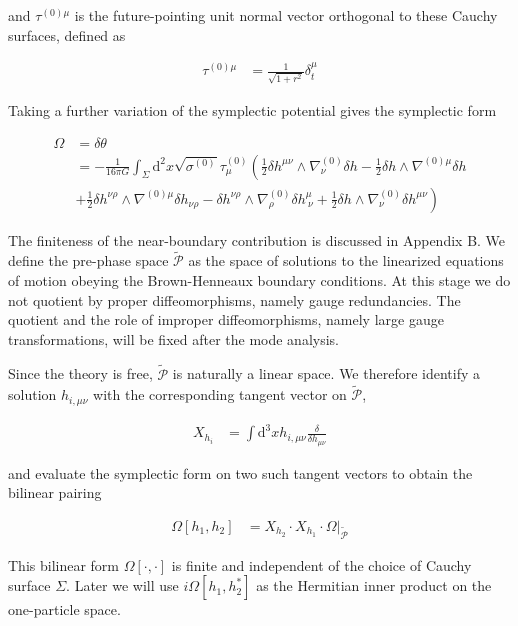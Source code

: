 and \(\displaystyle{\tau ^{(0)\mu}}\) is the future-pointing unit normal vector orthogonal to these Cauchy surfaces, defined as

\begin{align}
\tau ^{(0)\mu} & =\frac{1}{\sqrt{ 1+r^{2} }}\delta ^{\mu}_{t}
\end{align}

Taking a further variation of the symplectic potential gives the symplectic form

\begin{align}
\Omega & =\delta \theta \\
 & =-\frac{1}{16\pi G}\int _{\Sigma}\mathrm{d}^{2}x\sqrt{ \sigma ^{(0)} }\tau ^{(0)} _{\mu}\left(\frac{1}{2}\delta h^{\mu \nu}\wedge \nabla ^{(0)}_{\nu}\delta h-\frac{1}{2}\delta h\wedge \nabla ^{(0)\mu}\delta h\right. \\
 & \left.+\frac{1}{2}\delta h^{\nu \rho}\wedge \nabla ^{(0)\mu}\delta h_{\nu \rho}-\delta h^{\nu \rho}\wedge\nabla ^{(0)}_{\rho}\delta h^{\mu}_{~\nu}+\frac{1}{2}\delta h\wedge \nabla ^{(0)}_{\nu}\delta h^{\mu \nu}\right)
\end{align}

The finiteness of the near-boundary contribution is discussed in Appendix B. We define the pre-phase space \(\displaystyle{\tilde{\mathcal{P}}}\) as the space of solutions to the linearized equations of motion obeying the Brown-Henneaux boundary conditions. At this stage we do not quotient by proper diffeomorphisms, namely gauge redundancies. The quotient and the role of improper diffeomorphisms, namely large gauge transformations, will be fixed after the mode analysis.

Since the theory is free, \(\displaystyle{\tilde{\mathcal{P}}}\) is naturally a linear space. We therefore identify a solution \(\displaystyle{h_{i,\mu \nu}}\) with the corresponding tangent vector on \(\displaystyle{\tilde{\mathcal{P}}}\),

\begin{align}
X_{h_{i}} & =\int \mathrm{d}^{3}x h_{i,\mu \nu} \frac{\delta}{\delta h_{\mu \nu}}
\end{align}

and evaluate the symplectic form on two such tangent vectors to obtain the bilinear pairing

\begin{align}
\Omega[h_{1},h_{2}] & =X_{h_{2}}\cdot X_{h_{1}}\cdot \Omega|_{\tilde{\mathcal{P}}}
\end{align}

This bilinear form \(\displaystyle{\Omega[\cdot,\cdot]}\) is finite and independent of the choice of Cauchy surface \(\displaystyle{\Sigma}\). Later we will use \(\displaystyle{i\Omega[h_{1},h_{2}^{*}]}\) as the Hermitian inner product on the one-particle space.
